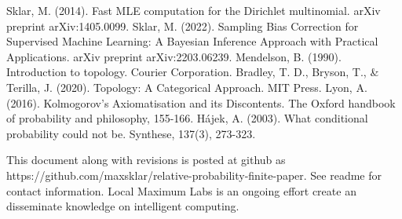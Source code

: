 \documentclass[twoside]{article}
\begin{document}

\begin{thebibliography}{20}

Sklar, M. (2014). Fast MLE computation for the Dirichlet multinomial. arXiv preprint arXiv:1405.0099.
Sklar, M. (2022). Sampling Bias Correction for Supervised Machine Learning: A Bayesian Inference Approach with Practical Applications. arXiv preprint arXiv:2203.06239.
Mendelson, B. (1990). Introduction to topology. Courier Corporation.
Bradley, T. D., Bryson, T., \& Terilla, J. (2020). Topology: A Categorical Approach. MIT Press.
Lyon, A. (2016). Kolmogorov’s Axiomatisation and its Discontents. The Oxford handbook of probability and philosophy, 155-166.
Hájek, A. (2003). What conditional probability could not be. Synthese, 137(3), 273-323.

\end{thebibliography}

This document along with revisions is posted at github as https://github.com/maxsklar/relative-probability-finite-paper. See readme for contact information. Local Maximum Labs is an ongoing effort create an disseminate knowledge on intelligent computing.
\end{document}
